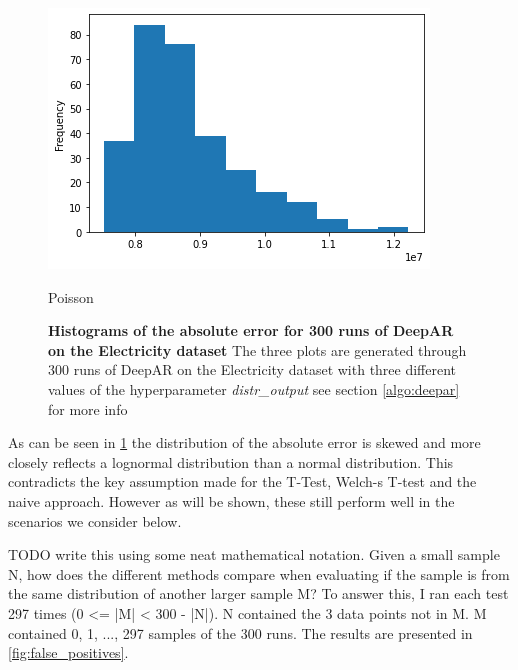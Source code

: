 \begin{figure}[htb]
      \includegraphics[width=\linewidth]{3_approach/figures/histogram_deepar_poisson_electricity_statistics_200_samples.png}
      \caption{Poisson}
      \label{fig:deepar_poisson_distribution}
    \endminipage
  \caption{\textbf{Histograms of the absolute error for 300 runs of DeepAR on the Electricity dataset} The three plots are generated through 300 runs of DeepAR on the Electricity dataset with three different values of the hyperparameter \emph{distr\_output} see section \ref{algo:deepar} for more info }
  \label{fig:deepar_elec_300_hist}
\end{figure}

As can be seen in \ref{fig:deepar_elec_300_hist} the distribution of the absolute error is skewed and more closely reflects a lognormal distribution than a normal distribution. This contradicts the key assumption made for the T-Test, Welch-s T-test and the naive approach. However as will be shown, these still perform well in the scenarios we consider below. 

TODO write this using some neat mathematical notation.
Given a small sample N, how does the different methods compare when evaluating if the sample is from the same distribution of another larger sample M? To answer this, I ran each test 297 times (0 <= |M| < 300 - |N|). N contained the 3 data points not in M. M contained {0, 1, ..., 297} samples of the 300 runs.  The results are presented in \ref{fig:false_positives}.


